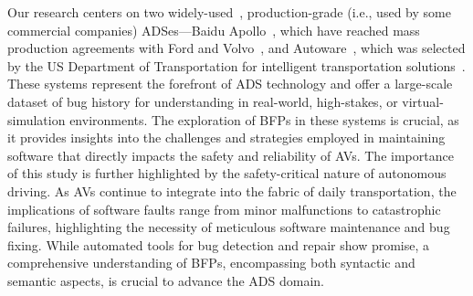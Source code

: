 Our research centers on two widely-used~\cite{udacity_apollo,baidu_volvo_ford}, production-grade (i.e., used by some commercial companies) ADSes---Baidu Apollo~\cite{baidu_apollo}, which have reached mass production agreements with Ford and Volvo~\cite{baidu_volvo_ford}, and Autoware~\cite{autoware}, which was selected by the US Department of Transportation for intelligent transportation solutions~\cite{carma_github}. 
These systems represent the forefront of ADS technology and offer a large-scale dataset of bug history for understanding \bfps in real-world, high-stakes, or virtual-simulation environments. The exploration of BFPs in these systems is crucial, as it provides insights into the challenges and strategies employed in maintaining software that directly impacts the safety and reliability of AVs.
The importance of this study is further highlighted by the safety-critical nature of autonomous driving. As AVs continue to integrate into the fabric of daily transportation, the implications of software faults range from minor malfunctions to catastrophic failures, highlighting the necessity of meticulous software maintenance and bug fixing. While automated tools for bug detection and repair show promise, a comprehensive understanding of BFPs, encompassing both syntactic and semantic aspects, is crucial to advance the ADS domain.

